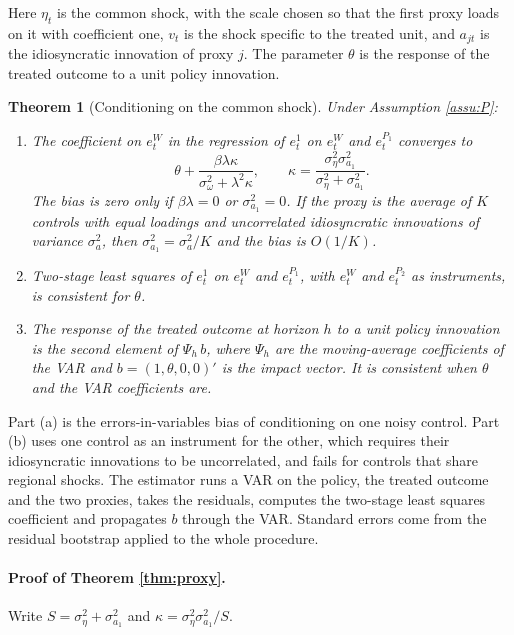 \documentclass[12pt,a4paper]{article}
\newtheorem{thm}{Theorem}
\theoremstyle{definition}
\begin{document}
Here $\eta_t$ is the common shock, with the scale chosen so that the first proxy loads on it with coefficient one, $v_t$ is the shock specific to the treated unit, and $a_{jt}$ is the idiosyncratic innovation of proxy $j$. The parameter $\theta$ is the response of the treated outcome to a unit policy innovation.

\begin{thm}[Conditioning on the common shock\label{thm:proxy}]
Under Assumption \ref{assu:P}:
\begin{enumerate}
\item[(a)] The coefficient on $e^W_t$ in the regression of $e^1_t$ on $e^W_t$ and $e^{P_1}_t$ converges to
\begin{equation}
\theta+\frac{\beta\lambda\kappa}{\sigma_\omega^2+\lambda^2\kappa},\qquad \kappa=\frac{\sigma_\eta^2\sigma_{a_1}^2}{\sigma_\eta^2+\sigma_{a_1}^2}.
\label{eq:proxy-bias}
\end{equation}
The bias is zero only if $\beta\lambda=0$ or $\sigma_{a_1}^2=0$. If the proxy is the average of $K$ controls with equal loadings and uncorrelated idiosyncratic innovations of variance $\sigma_a^2$, then $\sigma_{a_1}^2=\sigma_a^2/K$ and the bias is $O(1/K)$.
\item[(b)] Two-stage least squares of $e^1_t$ on $e^W_t$ and $e^{P_1}_t$, with $e^W_t$ and $e^{P_2}_t$ as instruments, is consistent for $\theta$.
\item[(c)] The response of the treated outcome at horizon $h$ to a unit policy innovation is the second element of $\Psi_h\,b$, where $\Psi_h$ are the moving-average coefficients of the VAR and $b=(1,\theta,0,0)'$ is the impact vector. It is consistent when $\theta$ and the VAR coefficients are.
\end{enumerate}
\end{thm}

Part (a) is the errors-in-variables bias of conditioning on one noisy control. Part (b) uses one control as an instrument for the other, which requires their idiosyncratic innovations to be uncorrelated, and fails for controls that share regional shocks. The estimator runs a VAR on the policy, the treated outcome and the two proxies, takes the residuals, computes the two-stage least squares coefficient and propagates $b$ through the VAR. Standard errors come from the residual bootstrap applied to the whole procedure.

\paragraph{Proof of Theorem \ref{thm:proxy}.} Write $S=\sigma_\eta^2+\sigma_{a_1}^2$ and $\kappa=\sigma_\eta^2\sigma_{a_1}^2/S$.
\end{document}
